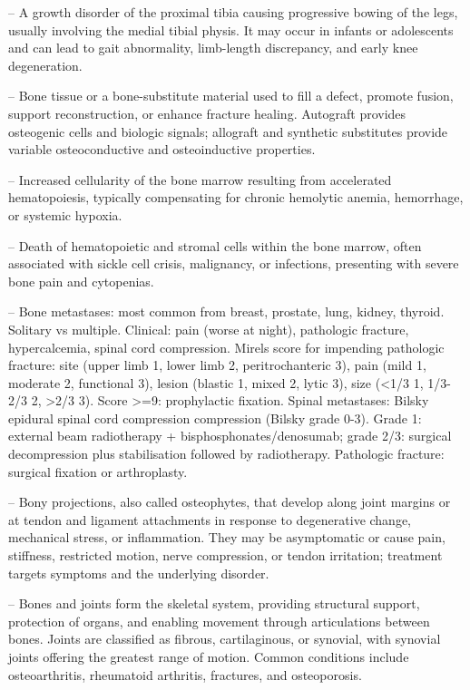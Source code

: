 -- A growth disorder of the proximal tibia causing progressive bowing of the legs, usually involving the medial tibial physis. It may occur in infants or adolescents and can lead to gait abnormality, limb-length discrepancy, and early knee degeneration.

-- Bone tissue or a bone-substitute material used to fill a defect, promote fusion, support reconstruction, or enhance fracture healing. Autograft provides osteogenic cells and biologic signals; allograft and synthetic substitutes provide variable osteoconductive and osteoinductive properties.

-- Increased cellularity of the bone marrow resulting from accelerated hematopoiesis, typically compensating for chronic hemolytic anemia, hemorrhage, or systemic hypoxia.

-- Death of hematopoietic and stromal cells within the bone marrow, often associated with sickle cell crisis, malignancy, or infections, presenting with severe bone pain and cytopenias.

-- Bone metastases: most common from breast, prostate, lung, kidney, thyroid. Solitary vs multiple. Clinical: pain (worse at night), pathologic fracture, hypercalcemia, spinal cord compression. Mirels score for impending pathologic fracture: site (upper limb 1, lower limb 2, peritrochanteric 3), pain (mild 1, moderate 2, functional 3), lesion (blastic 1, mixed 2, lytic 3), size (<1/3 1, 1/3-2/3 2, >2/3 3). Score >=9: prophylactic fixation. Spinal metastases: Bilsky epidural spinal cord compression compression (Bilsky grade 0-3). Grade 1: external beam radiotherapy + bisphosphonates/denosumab; grade 2/3: surgical decompression plus stabilisation followed by radiotherapy. Pathologic fracture: surgical fixation or arthroplasty.

-- Bony projections, also called osteophytes, that develop along joint margins or at tendon and ligament attachments in response to degenerative change, mechanical stress, or inflammation. They may be asymptomatic or cause pain, stiffness, restricted motion, nerve compression, or tendon irritation; treatment targets symptoms and the underlying disorder.

-- Bones and joints form the skeletal system, providing structural support, protection of organs, and enabling movement through articulations between bones. Joints are classified as fibrous, cartilaginous, or synovial, with synovial joints offering the greatest range of motion. Common conditions include osteoarthritis, rheumatoid arthritis, fractures, and osteoporosis.

